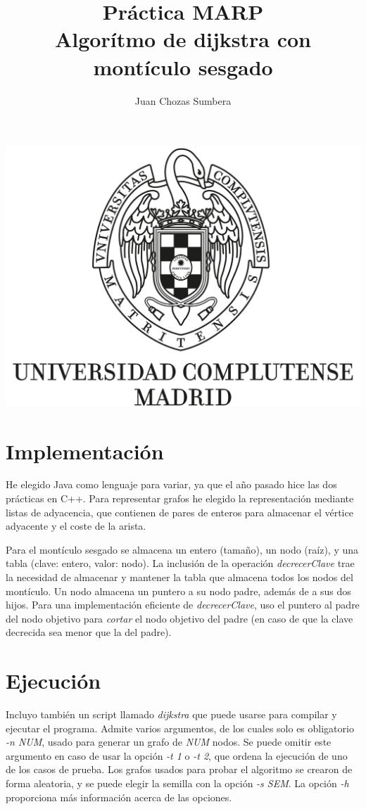 \documentclass[12pt , a4paper]{article}
\title{Práctica MARP\\Algorítmo de dijkstra con montículo sesgado}
\author{Juan Chozas Sumbera}
\begin{document}
	
	\maketitle
	\begin{center}
		\includegraphics[width=\textwidth]{logo_UCM.jpg}
	\end{center}
	
	\newpage
	
\section{Implementación}
	
	He elegido Java como lenguaje para variar, ya que el año pasado hice las dos prácticas en C++. Para representar grafos he elegido la representación mediante listas de adyacencia, que contienen de pares de enteros para almacenar el vértice adyacente y el coste de la arista.
	
	Para el montículo sesgado se almacena un entero (tamaño), un nodo (raíz), y una tabla (clave: entero, valor: nodo). La inclusión de la operación \textit{decrecerClave} trae la necesidad de almacenar y mantener la tabla que almacena todos los nodos del montículo. Un nodo almacena un puntero a su nodo padre, además de a sus dos hijos. Para una implementación eficiente de \textit{decrecerClave}, uso el puntero al padre del nodo objetivo para \textit{cortar} el nodo objetivo del padre (en caso de que la clave decrecida sea menor que la del padre).
	
\section{Ejecución}
	Incluyo también un script llamado \textit{dijkstra} que puede usarse para compilar y ejecutar el programa. Admite varios argumentos, de los cuales solo es obligatorio \textit{-n NUM}, usado para generar un grafo de \textit{NUM} nodos. Se puede omitir este argumento en caso de usar la opción \textit{-t 1} o \textit{-t 2}, que ordena la ejecución de uno de los casos de prueba. Los grafos usados para probar el algoritmo se crearon de forma aleatoria, y se puede elegir la semilla con la opción \textit{-s SEM}. La opción \textit{-h} proporciona más información acerca de las opciones.
\end{document}
